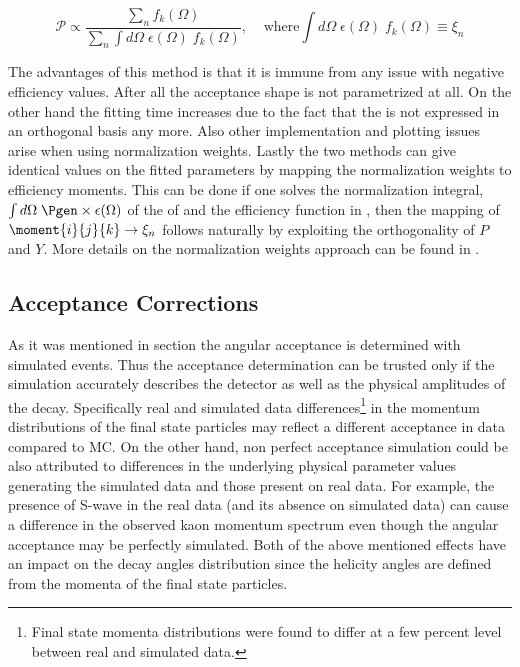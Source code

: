 \begin{equation}
  \mathcal{P} \propto \frac{\sum_n f_k(\Omega)}{\sum_n \int d\Omega \; \epsilon(\Omega) \; f_k(\Omega)}, \;\;\;\;\text{where} \int d\Omega \; \epsilon(\Omega) \; f_k(\Omega) \equiv \xi_n
  \label{norm_weights_pdf}
\end{equation}

The advantages of this method is that it is immune from any issue with negative efficiency values. After all the acceptance shape is not parametrized at all.
On the other hand the fitting time increases due to the fact that the \pdf is not expressed in an orthogonal basis any more. Also other
implementation and plotting issues arise when using normalization weights. Lastly the two methods can give identical values on the fitted parameters by mapping
the normalization weights to efficiency moments. This can be done if one solves the normalization integral, $\int d\Omega\;\Pgen\times\epsilon(\Omega)$
of the \pdf of  and the efficiency function in , then the mapping of $\moment{i}{j}{k} \rightarrow \xi_n$ follows naturally
by exploiting the orthogonality of $P$ and $Y$. More details on the normalization weights approach can be found in \cite{jeroenThesis}.

\subsection{Acceptance Corrections}
\label{Accceptance_Corrections}
As it was mentioned in section  the angular acceptance is determined with simulated \BsJpsiKst events.
Thus the acceptance determination can be trusted only if the simulation accurately describes the detector as well as the
physical amplitudes of the \BsJpsiKst decay. Specifically real and simulated data differences\footnote{Final state momenta distributions were found to differ at a few
percent level between real and simulated data.} in the momentum distributions
of the final state particles  may reflect a different acceptance in data compared to MC. On the other hand,
non perfect acceptance simulation could be also attributed to differences in the underlying physical parameter values generating
the simulated data and those present on real data. For example, the presence of S-wave in the real data (and its absence on simulated data)
can cause a difference in the observed kaon momentum spectrum even though the angular acceptance may be perfectly simulated.
Both of the above mentioned effects have an impact on the decay angles distribution since the helicity angles are defined
from the momenta of the final state particles.

